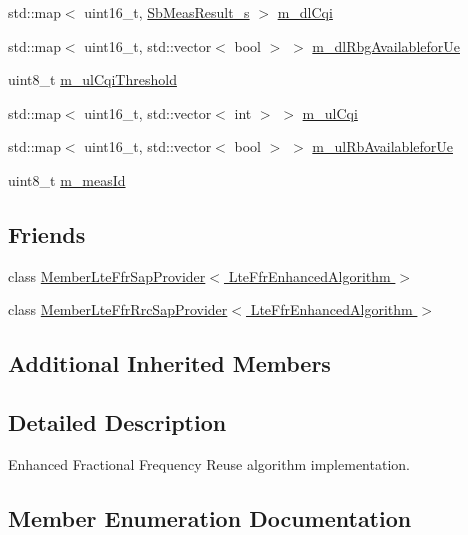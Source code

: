 \begin{DoxyCompactItemize}
\item 
std\+::map$<$ uint16\+\_\+t, \hyperlink{structns3_1_1SbMeasResult__s}{Sb\+Meas\+Result\+\_\+s} $>$ \hyperlink{classns3_1_1LteFfrEnhancedAlgorithm_a02c023319e87a4547dd96d9484a19295}{m\+\_\+dl\+Cqi}
\item 
std\+::map$<$ uint16\+\_\+t, std\+::vector$<$ bool $>$ $>$ \hyperlink{classns3_1_1LteFfrEnhancedAlgorithm_a4e860f4983b4082a15d9327ea3328f37}{m\+\_\+dl\+Rbg\+Availablefor\+Ue}
\item 
uint8\+\_\+t \hyperlink{classns3_1_1LteFfrEnhancedAlgorithm_a4d976f3ccd5eb1abf8a8bd8c58847481}{m\+\_\+ul\+Cqi\+Threshold}
\item 
std\+::map$<$ uint16\+\_\+t, std\+::vector$<$ int $>$ $>$ \hyperlink{classns3_1_1LteFfrEnhancedAlgorithm_a41e3081c0044484ce3dc5581b50f40a4}{m\+\_\+ul\+Cqi}
\item 
std\+::map$<$ uint16\+\_\+t, std\+::vector$<$ bool $>$ $>$ \hyperlink{classns3_1_1LteFfrEnhancedAlgorithm_ad079cda461248eb88043b5b461cd8b67}{m\+\_\+ul\+Rb\+Availablefor\+Ue}
\item 
uint8\+\_\+t \hyperlink{classns3_1_1LteFfrEnhancedAlgorithm_a219f2bfef31d829479617ae18ef2d53f}{m\+\_\+meas\+Id}
\end{DoxyCompactItemize}
\subsection*{Friends}
\begin{DoxyCompactItemize}
\item 
class \hyperlink{classns3_1_1LteFfrEnhancedAlgorithm_a3ebc2eacba72f84ac2545eff09c1306d}{Member\+Lte\+Ffr\+Sap\+Provider$<$ Lte\+Ffr\+Enhanced\+Algorithm $>$}
\item 
class \hyperlink{classns3_1_1LteFfrEnhancedAlgorithm_a989f98ea126b66abcf7c5f72b04e7fdb}{Member\+Lte\+Ffr\+Rrc\+Sap\+Provider$<$ Lte\+Ffr\+Enhanced\+Algorithm $>$}
\end{DoxyCompactItemize}
\subsection*{Additional Inherited Members}


\subsection{Detailed Description}
Enhanced Fractional Frequency Reuse algorithm implementation. 

\subsection{Member Enumeration Documentation}
